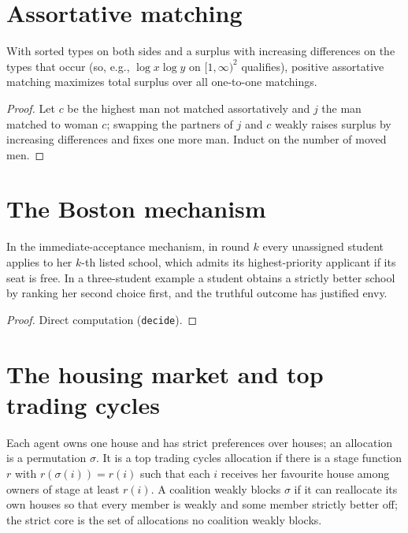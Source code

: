 \section{Assortative matching}

\begin{theorem}[Becker 1973]
\label{thm:becker}
\leanok
With sorted types on both sides and a surplus with increasing differences on the types that occur (so, e.g.,
$\log x \log y$ on $[1,\infty)^2$ qualifies), positive assortative matching maximizes
total surplus over all one-to-one matchings.
\end{theorem}
\begin{proof}
\leanok
Let $c$ be the highest man not matched assortatively and $j$ the man matched to woman $c$; swapping the partners of
$j$ and $c$ weakly raises surplus by increasing differences and fixes one more man. Induct on the number of moved
men.
\end{proof}


\section{The Boston mechanism}
\label{sec:boston}

\begin{theorem}
\label{thm:boston}
\leanok
In the immediate-acceptance mechanism, in round $k$ every unassigned student applies to her $k$-th listed school,
which admits its highest-priority applicant if its seat is free. In a three-student example a student obtains a
strictly better school by ranking her second choice first, and the truthful outcome has justified envy.
\end{theorem}
\begin{proof}
\leanok
Direct computation (\texttt{decide}).
\end{proof}

\section{The housing market and top trading cycles}
\label{sec:housing-market}

\begin{definition}
\label{def:ttc}
\leanok
Each agent owns one house and has strict preferences over houses; an allocation is a permutation $\sigma$. It is a
top trading cycles allocation if there is a stage function $r$ with $r(\sigma(i)) = r(i)$ such that each $i$
receives her favourite house among owners of stage at least $r(i)$. A coalition weakly blocks $\sigma$ if it can
reallocate its own houses so that every member is weakly and some member strictly better off; the strict core is
the set of allocations no coalition weakly blocks.
\end{definition}


